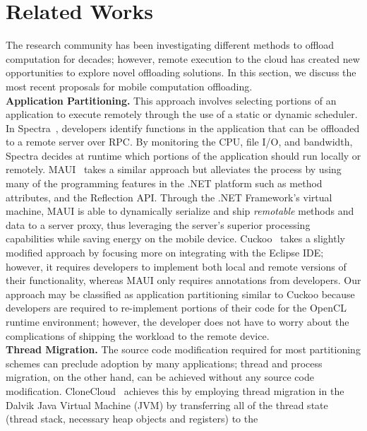 \documentclass[10pt, conference, compsocconf]{IEEEtran}
\begin{document}
\section{Related Works}
%
The research community has been investigating different methods to
offload computation for decades; however, remote execution to the cloud
has created new opportunities to explore novel offloading solutions.
%
In this section, we discuss the most recent proposals for mobile
computation offloading.\\
%
\indent\textbf{Application Partitioning.} This approach involves selecting
portions of an application to execute remotely through the use of a
static or dynamic scheduler.
%
In Spectra~\cite{spectra}, developers identify functions in the
application that can be offloaded to a remote server over RPC.
%
By monitoring the CPU, file I/O, and bandwidth, Spectra 
decides at runtime which portions of the application should run locally
or remotely.
%
MAUI~\cite{maui} takes a similar approach but alleviates the process by
using many of the programming features in the .NET platform such as
method attributes, and the Reflection API.
%
Through the .NET Framework's virtual machine, MAUI is able to
dynamically serialize and ship \textit{remotable} methods and data to a
server proxy, thus leveraging the server's superior processing
capabilities while saving energy on the mobile device.
%
Cuckoo~\cite{cuckoo} takes a slightly modified approach by focusing more
on integrating with the Eclipse IDE; however, it requires developers to
implement both local and remote versions of their functionality, whereas
MAUI only requires annotations from developers.
%
Our approach may be classified as application partitioning similar to
Cuckoo because developers are required to re-implement portions of their
code for the OpenCL runtime environment; however, the developer does not
have to worry about the complications of shipping the workload to the
remote device.\\
%
\indent\textbf{Thread Migration.} The source code modification required for
most partitioning schemes can preclude adoption by many applications;
thread and process migration, on the other hand, can be achieved without
any source code modification.
%
CloneCloud~\cite{clonecloud} achieves this by employing thread migration
in the Dalvik Java Virtual Machine (JVM) by transferring all of the
thread state (thread stack, necessary heap objects and registers) to the
\end{document}
